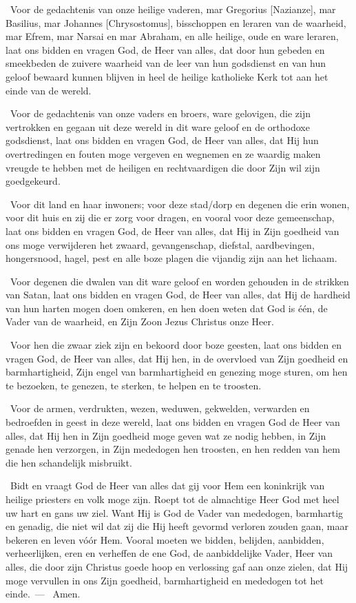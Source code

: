 \documentclass[12pt,twoside,a5paper]{article}
\begin{document}
\begin{halfparskip}
  \dd~Voor de gedachtenis van onze heilige vaderen, mar Gregorius [Nazianze], mar Basilius, mar Johannes [Chrysostomus], bisschoppen en leraren van de waarheid, mar Efrem, mar Narsai en mar Abraham, en alle heilige, oude en ware leraren, laat ons bidden en vragen God, de Heer van alles, dat door hun gebeden en smeekbeden de zuivere waarheid van de leer van hun godsdienst en van hun geloof bewaard kunnen blijven in heel de heilige katholieke Kerk tot aan het einde van de wereld.

  \dd~Voor de gedachtenis van onze vaders en broers, ware gelovigen, die zijn vertrokken en gegaan uit deze wereld in dit ware geloof en de orthodoxe godsdienst, laat ons bidden en vragen God, de Heer van alles, dat Hij hun overtredingen en fouten moge vergeven en wegnemen en ze waardig maken vreugde te hebben met de heiligen en rechtvaardigen die door Zijn wil zijn goedgekeurd.

  \dd~Voor dit land en haar inwoners; voor deze stad/dorp en degenen die erin wonen, voor dit huis en zij die er zorg voor dragen, en vooral voor deze gemeenschap, laat ons bidden en vragen God, de Heer van alles, dat Hij in Zijn goedheid van ons moge verwijderen het zwaard, gevangenschap, diefstal, aardbevingen, hongersnood, hagel, pest en alle boze plagen die vijandig zijn aan het lichaam.

  \dd~Voor degenen die dwalen van dit ware geloof en worden gehouden in de strikken van Satan, laat ons bidden en vragen God, de Heer van alles, dat Hij de hardheid van hun harten mogen doen omkeren, en hen doen weten dat God is één, de Vader van de waarheid, en Zijn Zoon Jezus Christus onze Heer.

  \dd~Voor hen die zwaar ziek zijn en bekoord door boze geesten, laat ons bidden en vragen God, de Heer van alles, dat Hij hen, in de overvloed van Zijn goedheid en barmhartigheid, Zijn engel van barmhartigheid en genezing moge sturen, om hen te bezoeken, te genezen, te sterken, te helpen en te troosten.

  \dd~Voor de armen, verdrukten, wezen, weduwen, gekwelden, verwarden en bedroefden in geest in deze wereld, laat ons bidden en vragen God de Heer van alles, dat Hij hen in Zijn goedheid moge geven wat ze nodig hebben, in Zijn genade hen verzorgen, in Zijn mededogen hen troosten, en hen redden van hem die hen schandelijk misbruikt.

  \dd~Bidt en vraagt God de Heer van alles dat gij voor Hem een koninkrijk van heilige priesters en volk moge zijn. Roept tot de almachtige Heer God met heel uw hart en gans uw ziel. Want Hij is God de Vader van mededogen, barmhartig en genadig, die niet wil dat zij die Hij heeft gevormd verloren zouden gaan, maar bekeren en leven vóór Hem. Vooral moeten we bidden, belijden, aanbidden, verheerlijken, eren en verheffen de ene God, de aanbiddelijke Vader, Heer van alles, die door zijn Christus goede hoop en verlossing gaf aan onze zielen, dat Hij moge vervullen in ons Zijn goedheid, barmhartigheid en mededogen tot het einde.~--- \rr~Amen.\liturgicalRbracket
\end{halfparskip}
\end{document}
